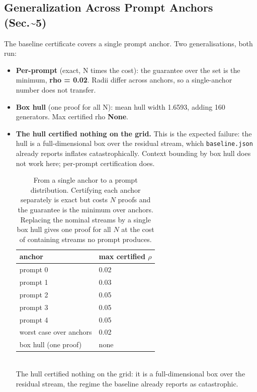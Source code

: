 \documentclass[10pt,journal]{IEEEtran}
\begin{document}
\subsection{Generalization Across Prompt Anchors (Sec.\textasciitilde{}5)}
The baseline certificate covers a single prompt anchor. Two generalisations, both run:
\begin{itemize}
\item \textbf{Per-prompt} (exact, N times the cost): the guarantee over the set is the minimum, \textbf{rho = 0.02}. Radii differ across anchors, so a single-anchor number does not transfer.
\item \textbf{Box hull} (one proof for all N): mean hull width 1.6593, adding 160 generators. Max certified rho \textbf{None}.
\item \textbf{The hull certified nothing on the grid.} This is the expected failure: the hull is a full-dimensional box over the residual stream, which \texttt{baseline.json} already reports inflates catastrophically. Context bounding by box hull does not work here; per-prompt certification does.

\begin{table}[t]
\centering
\caption{From a single anchor to a prompt distribution. Certifying each anchor separately is exact but costs $N$ proofs and the guarantee is the minimum over anchors. Replacing the nominal streams by a single box hull gives one proof for all $N$ at the cost of containing streams no prompt produces.}
\label{tab:distribution}
\begin{tabular}{l l}
\toprule
anchor & {max certified $\rho$} \\
\midrule
prompt 0 & 0.02 \\
prompt 1 & 0.03 \\
prompt 2 & 0.05 \\
prompt 3 & 0.05 \\
prompt 4 & 0.05 \\
\midrule
worst case over anchors & 0.02 \\
box hull (one proof) & {none} \\
\bottomrule
\end{tabular}
\\[2pt]\footnotesize The hull certified nothing on the grid: it is a full-dimensional box over the residual stream, the regime the baseline already reports as catastrophic.
\end{table}

\end{itemize}
\end{document}
